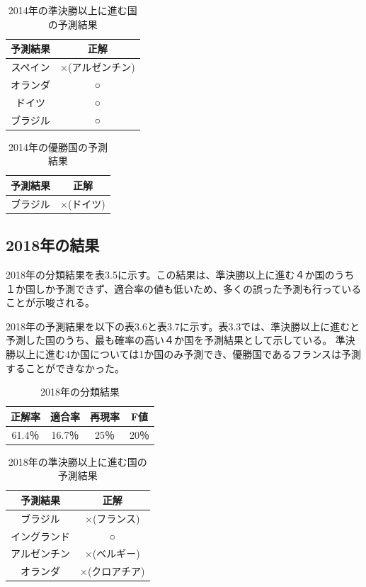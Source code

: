 \documentclass[platex]{suribt}
\begin{document}
\begin{table}[h]
  \centering
  \begin{tabular}{|c|c|}
    \hline
    予測結果 & 正解 \\ \hline
    スペイン &  ×(アルゼンチン)\\ \hline
    オランダ &  ○ \\ \hline
    ドイツ & ○ \\ \hline
    ブラジル & ○  \\ \hline
  \end{tabular}
  \caption{2014年の準決勝以上に進む国の予測結果}
\end{table}

\begin{table}[h]
  \centering
  \begin{tabular}{|c|c|}
    \hline
    予測結果 & 正解 \\ \hline
    ブラジル & ×(ドイツ) \\ \hline
  \end{tabular}
  \caption{2014年の優勝国の予測結果}
\end{table}

\subsection{2018年の結果}
2018年の分類結果を表3.5に示す。この結果は、準決勝以上に進む４か国のうち１か国しか予測できず、適合率の値も低いため、多くの誤った予測も行っていることが示唆される。

2018年の予測結果を以下の表3.6と表3.7に示す。表3.3では、準決勝以上に進むと予測した国のうち、最も確率の高い４か国を予測結果として示している。
準決勝以上に進む4か国については1か国のみ予測でき、優勝国であるフランスは予測することができなかった。

\begin{table}[h]
  \centering
  \begin{tabular}{|c|c|c|c|}
    \hline
    正解率 & 適合率 & 再現率 & F値 \\ \hline
    61.4％ & 16.7％ & 25％ & 20％ \\ \hline
  \end{tabular}
  \caption{2018年の分類結果}
\end{table}

\begin{table}[h]
  \centering
  \begin{tabular}{|c|c|}
    \hline
    予測結果 & 正解 \\ \hline
    ブラジル &  ×(フランス)\\ \hline
    イングランド &  ○ \\ \hline
    アルゼンチン & ×(ベルギー) \\ \hline
    オランダ & ×(クロアチア) \\ \hline
  \end{tabular}
  \caption{2018年の準決勝以上に進む国の予測結果}
\end{table}
\end{document}

